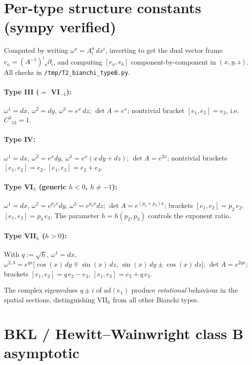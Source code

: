 \documentclass[11pt,a4paper]{article}
\begin{document}
\section{Per-type structure constants (sympy verified)}

Computed by writing $\omega^a = A^a_i\,dx^i$, inverting to get the dual
vector frame $e_a = (A^{-1})^i{}_a \partial_i$, and computing
$[e_a, e_b]$ component-by-component in $(x,y,z)$. All checks in
\texttt{/tmp/T2\_bianchi\_typeB.py}.

\paragraph{Type III ($=$ VI$_{-1}$):}
$\omega^1 = dx$, $\omega^2 = dy$, $\omega^3 = e^x\,dz$;
$\det A = e^x$;
nontrivial bracket $[e_1, e_3] = e_3$, i.e.\ $C^3{}_{13} = 1$.

\paragraph{Type IV:}
$\omega^1 = dx$, $\omega^2 = e^x dy$, $\omega^3 = e^x(x\,dy + dz)$;
$\det A = e^{2x}$;
nontrivial brackets $[e_1, e_2] = e_2$, $[e_1, e_3] = e_2 + e_3$.

\paragraph{Type VI$_h$ (generic $h<0$, $h \neq -1$):}
$\omega^1 = dx$, $\omega^2 = e^{p_2 x} dy$, $\omega^3 = e^{p_3 x} dz$;
$\det A = e^{(p_2+p_3) x}$;
brackets $[e_1, e_2] = p_2\,e_2$, $[e_1, e_3] = p_3\,e_3$.
The parameter $h = h(p_2, p_3)$ controls the exponent ratio.

\paragraph{Type VII$_h$ ($h > 0$):}
With $q := \sqrt{h}$,
$\omega^1 = dx$,
$\omega^{2,3} = e^{q x} \big[\cos(x)\,dy \mp \sin(x)\,dz,\,
\sin(x)\,dy \pm \cos(x)\,dz\big]$;
$\det A = e^{2qx}$;
brackets $[e_1, e_2] = q\,e_2 - e_3$, $[e_1, e_3] = e_2 + q\,e_3$.

The complex eigenvalues $q \pm i$ of $\mathrm{ad}(e_1)$ produce
\emph{rotational} behaviour in the spatial sections, distinguishing VII$_h$
from all other Bianchi types.

\section{BKL / Hewitt--Wainwright class B asymptotic}
\end{document}
